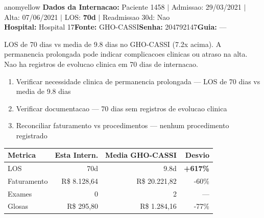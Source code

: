 \documentclass[a4paper,10pt]{article}
\begin{document}
\newpage

\begin{anomalycard}[Internacao 1244 | GHO-CASSI | MODERADO (z=2.21)]{anomyellow}
\textbf{Dados da Internacao:} Paciente 1458 $\mid$ Admissao: 29/03/2021 $\mid$ Alta: 07/06/2021 $\mid$ LOS: \textbf{70d} $\mid$ Readmissao 30d: Nao\\
\textbf{Hospital:} Hospital 17\quad\textbf{Fonte:} GHO-CASSI\quad\textbf{Senha:} 204792147\quad\textbf{Guia:} ---\\
\vspace{2pt}\begin{tcolorbox}[colback=severityred!20,colframe=anomyellow,title={\textbf{Interpretacao de Negocio}},fonttitle=\bfseries\small,left=4pt,right=4pt,top=3pt,bottom=3pt]
{\small LOS de 70 dias vs media de 9.8 dias no GHO-CASSI (7.2x acima). A permanencia prolongada pode indicar complicacoes clinicas ou atraso na alta. Nao ha registros de evolucao clinica em 70 dias de internacao.}
\end{tcolorbox}
\begin{tcolorbox}[colback=severityyellow!30,colframe=anomorange,title={\textbf{Recomendacoes Especificas}},fonttitle=\bfseries\small,left=4pt,right=4pt,top=3pt,bottom=3pt]
\begin{enumerate}[nosep,leftmargin=16pt]
\item {\small Verificar necessidade clinica de permanencia prolongada --- LOS de 70 dias vs media de 9.8 dias}
\item {\small Verificar documentacao --- 70 dias sem registros de evolucao clinica}
\item {\small Reconciliar faturamento vs procedimentos --- nenhum procedimento registrado}
\end{enumerate}
\end{tcolorbox}
\begin{center}\begin{tabular}{l r r r}\toprule\textbf{Metrica} & \textbf{Esta Intern.} & \textbf{Media GHO-CASSI} & \textbf{Desvio} \\\midrule
LOS & 70d & 9.8d & \textcolor{anomred}{\textbf{+617\%}} \\
Faturamento & R\$ 8.128,64 & R\$ 20.221,82 & -60\% \\
Exames & 0 & 2 & --- \\
Glosas & R\$ 295,80 & R\$ 1.284,16 & -77\% \\
\bottomrule\end{tabular}\end{center}


\end{anomalycard}
\end{document}
